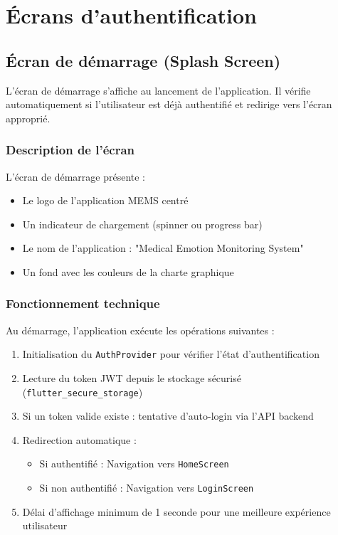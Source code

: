 \documentclass[a4paper,11pt]{report}
\begin{document}
\section{Écrans d'authentification}

\subsection{Écran de démarrage (Splash Screen)}

L'écran de démarrage s'affiche au lancement de l'application. Il vérifie automatiquement si l'utilisateur est déjà authentifié et redirige vers l'écran approprié.

\subsubsection{Description de l'écran}

L'écran de démarrage présente :
\begin{itemize}
    \item Le logo de l'application MEMS centré
    \item Un indicateur de chargement (spinner ou progress bar)
    \item Le nom de l'application : "Medical Emotion Monitoring System"
    \item Un fond avec les couleurs de la charte graphique
\end{itemize}

\subsubsection{Fonctionnement technique}

Au démarrage, l'application exécute les opérations suivantes :
\begin{enumerate}
    \item Initialisation du \texttt{AuthProvider} pour vérifier l'état d'authentification
    \item Lecture du token JWT depuis le stockage sécurisé (\texttt{flutter\_secure\_storage})
    \item Si un token valide existe : tentative d'auto-login via l'API backend
    \item Redirection automatique :
    \begin{itemize}
        \item Si authentifié : Navigation vers \texttt{HomeScreen}
        \item Si non authentifié : Navigation vers \texttt{LoginScreen}
    \end{itemize}
    \item Délai d'affichage minimum de 1 seconde pour une meilleure expérience utilisateur
\end{enumerate}
\end{document}
